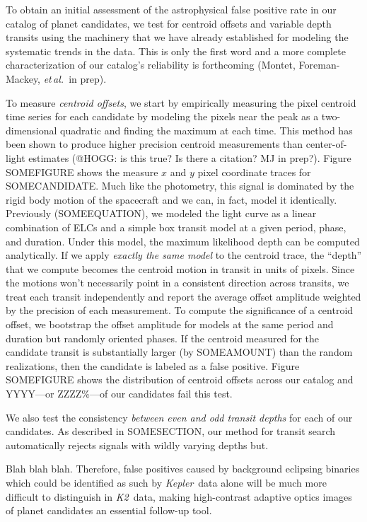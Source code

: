 \documentclass[12pt,preprint]{aastex}
\newcommand{\project}[1]{\textsl{#1}} %
\newcommand{\kepler}{\project{Kepler}}
\newcommand{\KT}{\project{K2}}
\newcommand{\foreign}[1]{\emph{#1}}
\newcommand{\etal}{\foreign{et\,al.}}
\begin{document}
To obtain an initial assessment of the astrophysical false positive rate in
our catalog of planet candidates, we test for centroid offsets and variable
depth transits using the machinery that we have already established for
modeling the systematic trends in the data.
This is only the first word and a more complete characterization of our
catalog's reliability is forthcoming (Montet, Foreman-Mackey, \etal\ in prep).

To measure \emph{centroid offsets}, we start by empirically measuring the
pixel centroid time series for each candidate by modeling the pixels near the
peak as a two-dimensional quadratic and finding the maximum at each time.
This method has been shown to produce higher precision centroid measurements
than center-of-light estimates (@HOGG: is this true? Is there a citation? MJ
in prep?).
Figure SOMEFIGURE shows the measure $x$ and $y$ pixel coordinate traces for
SOMECANDIDATE.
Much like the photometry, this signal is dominated by the rigid body motion
of the spacecraft and we can, in fact, model it identically.
Previously (SOMEEQUATION), we modeled the light curve as a linear combination
of ELCs and a simple box transit model at a given period, phase, and duration.
Under this model, the maximum likelihood depth can be computed analytically.
If we apply \emph{exactly the same model} to the centroid trace, the ``depth''
that we compute becomes the centroid motion in transit in units of pixels.
Since the motions won't necessarily point in a consistent direction across
transits, we treat each transit independently and report the average offset
amplitude weighted by the precision of each measurement.
To compute the significance of a centroid offset, we bootstrap the offset
amplitude for models at the same period and duration but randomly oriented
phases.
If the centroid measured for the candidate transit is substantially larger
(by SOMEAMOUNT) than the random realizations, then the candidate is labeled
as a false positive.
Figure SOMEFIGURE shows the distribution of centroid offsets across our
catalog and YYYY---or ZZZZ\%---of our candidates fail this test.

We also test the consistency \emph{between even and odd transit depths} for
each of our candidates.
As described in SOMESECTION, our method for transit search automatically
rejects signals with wildly varying depths but.

Blah blah blah.
Therefore, false positives caused by background eclipsing binaries which could
be identified as such by \kepler\ data alone will be much more difficult to
distinguish in \KT\ data, making high-contrast adaptive optics images of
planet candidates an essential follow-up tool.
\end{document}
